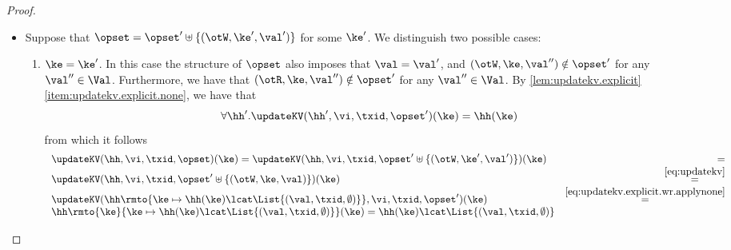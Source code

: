 \begin{proof}
\begin{enumerate}
\begin{itemize}
		\item Suppose that $\opset = \opset' \uplus \{(\otW, \ke', \val')\}$ 
		for some $\ke'$. We distinguish two possible cases:
			\begin{enumerate}
			\item $\ke = \ke'$. In this case the structure of $\opset$ also imposes that $\val = \val'$, 
			and $(\otW, \ke, \val'') \notin \opset'$ for any $\val'' \in \Val$. Furthermore, we have 
			that $(\otR, \ke, \val'') \notin \opset'$ for any $\val'' \in \Val$. 
			By \cref{lem:updatekv.explicit}\eqref{item:updatekv.explicit.none}, we have that 
			\begin{equation}
			\forall \hh'.\updateKV(\hh', \vi, \txid, \opset')(\ke) = \hh(\ke)
			\label{eq:updatekv.explicit.wr.applynone}
			\end{equation}
			from which it follows 
			\[
			\begin{array}{lr}
			\updateKV(\hh, \vi, \txid, \opset)(\ke) = \updateKV(\hh, \vi, \txid, \opset' \uplus \{(\otW, \ke', \val')\})(\ke) &=\\ 
			\updateKV(\hh, \vi, \txid, \opset' \uplus \{(\otW, \ke, \val)\})(\ke) &\stackrel{\eqref{eq:updatekv}}{=}\\
			\updateKV(\hh\rmto{\ke \mapsto \hh(\ke) \lcat \List{(\val, \txid, \emptyset)}}, \vi, \txid, \opset')(\ke) &\stackrel{\eqref{eq:updatekv.explicit.wr.applynone}}{=}\\
			\hh\rmto{\ke}{\ke\mapsto \hh(\ke) \lcat \List{(\val, \txid, \emptyset)}}(\ke) = \hh(\ke) \lcat \List{(\val, \txid, \emptyset)}
			\end{array}
			\]
			

\end{enumerate}
\end{itemize}
\end{enumerate}
\end{proof}
